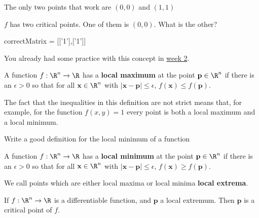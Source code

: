 \documentclass{ximera}
\begin{document}
\begin{question}
\begin{solution}
			\begin{hint}
				The only two points that work are $(0,0)$ and $(1,1)$
			\end{hint}
			$f$ has two critical points.  One of them is $(0,0)$.  What is the other?
			\begin{matrix-answer}
				correctMatrix = [['1'],['1']]
			\end{matrix-answer}
		\end{solution}
	\end{question}
	
	You already had some practice with this concept in \href{http://ximera.osu.edu/course/kisonecat/m2o2c2/course/activity/week2/practice/stationary-points/}{week 2}.
	
	\begin{definition}
		A function $f:\R^n \to \R$ has a \textbf{local maximum} at the point $\mathbf{p} \in \R^n$ if there is an $\epsilon \gt 0$ so that for all $\mathbf{x} \in \R^n$
		with $|\mathbf{x} - \mathbf{p}| \leq \epsilon$, $f(\mathbf{x}) \leq f(\mathbf{p})$.
	\end{definition}
	
	\begin{warning}
		The fact that the inequalities in this definition are not strict means that, for example, for the function $f(x,y) = 1$ every point is both a local maximum and a local minimum.
	\end{warning}
	
	Write a good definition for the local minimum of a function
	\begin{free-response}
		A function $f:\R^n \to \R$ has a \textbf{local minimum} at the point $\mathbf{p} \in \R^n$ if there is an $\epsilon \gt 0$ so that for all $\mathbf{x} \in \R^n$
		with $|\mathbf{x} - \mathbf{p}| \leq \epsilon$, $f(\mathbf{x}) \geq f(\mathbf{p})$.
	\end{free-response}
		
	We call points which are either local maxima or local minima \textbf{local extrema}.
		
	\begin{theorem}
		If $f:\R^n \to \R$ is a differentiable function, and $\mathbf{p}$ a local extremum.  Then $\mathbf{p}$ is a critical point of $f$.
	\end{theorem}
	
\end{document}
